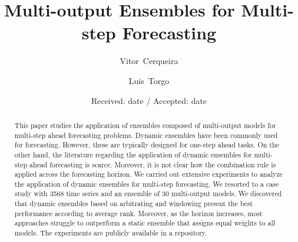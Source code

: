 \documentclass[smallcondensed]{svjour3}
\begin{document}
\title{Multi-output Ensembles for Multi-step Forecasting%
}


\author{Vitor~Cerqueira         \and
        Luis~Torgo
}



\date{Received: date / Accepted: date}

\maketitle

\begin{abstract}

This paper studies the application of ensembles composed of multi-output models for multi-step ahead forecasting problems.
Dynamic ensembles have been commonly used for forecasting. However, these are typically designed for one-step ahead tasks.
On the other hand, the literature regarding the application of dynamic ensembles for multi-step ahead forecasting is scarce. Moreover, it is not clear how the combination rule is applied across the forecasting horizon.
We carried out extensive experiments to analyze the application of dynamic ensembles for multi-step forecasting. We resorted to a case study with 3568 time series and an ensemble of 30 multi-output models.
We discovered that dynamic ensembles based on arbitrating and windowing present the best performance according to average rank. Moreover, as the horizon increases, most approaches struggle to outperform a static ensemble that assigns equal weights to all models.
The experiments are publicly available in a repository.

\end{abstract}
\end{document}
